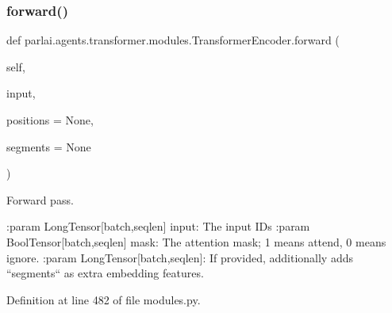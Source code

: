 \subsubsection{\texorpdfstring{forward()}{forward()}}
{\footnotesize\ttfamily def parlai.\+agents.\+transformer.\+modules.\+Transformer\+Encoder.\+forward (\begin{DoxyParamCaption}\item[{}]{self,  }\item[{}]{input,  }\item[{}]{positions = {\ttfamily None},  }\item[{}]{segments = {\ttfamily None} }\end{DoxyParamCaption})}

\begin{DoxyVerb}Forward pass.

:param LongTensor[batch,seqlen] input:
    The input IDs
:param BoolTensor[batch,seqlen] mask:
    The attention mask; 1 means attend, 0 means ignore.
:param LongTensor[batch,seqlen]:
    If provided, additionally adds ``segments`` as extra embedding features.
\end{DoxyVerb}
 

Definition at line 482 of file modules.\+py.


